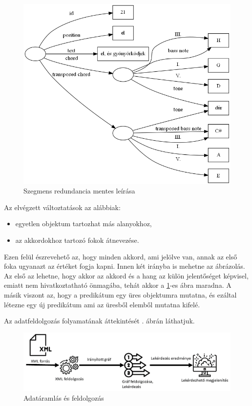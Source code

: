 \begin{figure}[h]
	\centering
	\includegraphics[scale=0.5]{images/img_src/rdf_graph_7.png}
	\caption{Szegmens redundancia mentes leírása}
	\label{fig:graph7}
\end{figure}

Az elvégzett változtatások az alábbiak:
\begin{itemize}
	\item egyetlen objektum tartozhat más alanyokhoz,
	\item az akkordokhoz tartozó fokok átnevezése.
\end{itemize}

Ezen felül észrevehető az, hogy minden akkord, ami jelölve van, annak az első foka ugyanazt az értéket fogja kapni. Innen két irányba is mehetne az ábrázolás. Az első az lehetne, hogy akkor az akkord és a hang az külön jelentőséget képvisel, emiatt nem hivatkoztatható önmagába, tehát akkor a \ref{fig:graph7}-es ábra maradna. A másik viszont az, hogy a predikátum egy üres objektumra mutatna, és ezáltal létezne egy új predikátum ami az üresből elemből mutatna kifelé.


Az adatfeldolgozás folyamatának áttekintését . ábrán láthatjuk.

\begin{figure}[h]
	\centering
	\includegraphics[scale=0.45]{images/presentation/data_flow.png}
	\caption{Adatáramlás és feldolgozás}
	\label{fig:flow1}
\end{figure}

